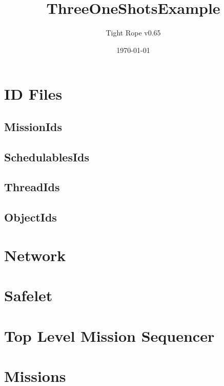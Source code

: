 \documentclass[10pt,a4paper]{article}
\title{ThreeOneShotsExample}
\author{Tight Rope v0.65}
\date{\today}
\begin{document}
\maketitle

\section{ID Files}
\subsection{MissionIds}

\newpage

\subsection{SchedulablesIds}

\newpage

\subsection{ThreadIds}

\newpage

\subsection{ObjectIds}

\newpage

\section{Network}

\newpage


\section{Safelet}

\newpage
{}
\newpage

\section{Top Level Mission Sequencer}

\newpage
{}
\newpage

\section{Missions}
\end{document}
